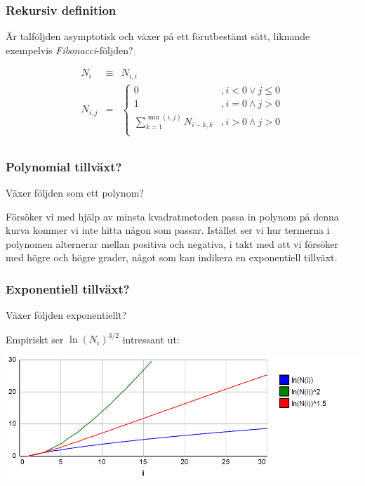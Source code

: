 \documentclass{beamer}
\begin{document}
\begin{frame}
	\frametitle{Rekursiv definition}
	Är talföljden asymptotisk och växer på ett förutbestämt sätt, liknande
	exempelvis \emph{Fibonacci}-följden?
	
	\[
	\begin{array}{rcl}
	N_i & \equiv & N_{i,i} \\[5pt]
	N_{i,j} & = & \left\{
	\begin{array}{ll}
	0 & , i < 0 \vee j \leq 0\\[5pt]
	1 & ,i=0 \wedge j > 0\\[5pt]
	\displaystyle\sum_{k=1}^{\min(i,j)}N_{i-k,k} & ,i>0 \wedge j>0\\
	\end{array}
	\right.\\
	\end{array}
	\]
\end{frame}

\begin{frame}
	\frametitle{Polynomial tillväxt?}
	{
	\Large
	Växer följden som ett polynom?
	}
	
	\vspace{20pt}
	Försöker vi med hjälp av minsta kvadratmetoden passa in polynom på denna kurva kommer vi inte hitta någon som passar. Istället ser vi hur termerna i polynomen alternerar mellan positiva och negativa, i takt med att vi försöker med högre och högre grader, något som kan indikera en exponentiell tillväxt.
\end{frame}

\begin{frame}
	\frametitle{Exponentiell tillväxt?}
	{
		\Large
		Växer följden exponentiellt?
	}
	
	\vspace{20pt}
	Empiriskt ser $\ln(N_i)^{3/2}$ intressant ut:
	\begin{center}
		\includegraphics[scale=0.5]{Export/Complexity2.png}
	\end{center}
\end{frame}
\end{document}
